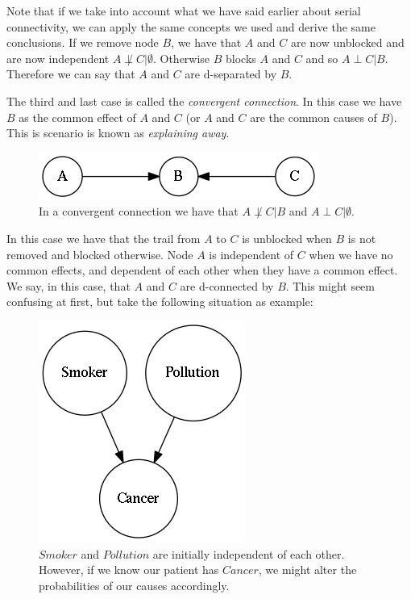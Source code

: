 \documentclass{amsart}
\theoremstyle{plain}
\begin{document}
Note that if we take into account what we have said earlier about serial connectivity, we can apply
the same concepts we used and derive the same conclusions. If we remove node $B$, we have that
$A$ and $C$ are now unblocked and are now independent $A\not\perp C|\emptyset$. Otherwise $B$
blocks $A$ and $C$ and so $A\perp C|B$. Therefore we can say that $A$ and $C$ are d-separated by
$B$.

The third and last case is called the \textit{convergent connection}. In this case we have $B$ as
the common effect of $A$ and $C$ (or $A$ and $C$ are the common causes of $B$). This is scenario is
known as \textit{explaining away}.

\begin{figure}[h]
  \captionsetup{justification=centering}
  \centering\includegraphics[scale=0.3]{graphs/convergent.png}
  \caption{In a convergent connection we have that $A\not\perp C|B$ and $A\perp C|\emptyset$.}
\end{figure}

In this case we have that the trail from $A$ to $C$ is unblocked when $B$ is not removed and
blocked otherwise. Node $A$ is independent of $C$ when we have no common effects, and dependent of
each other when they have a common effect. We say, in this case, that $A$ and $C$ are d-connected
by $B$. This might seem confusing at first, but take the following situation as example:

\begin{figure}[h]
  \captionsetup{justification=centering}
  \centering\includegraphics[scale=0.3]{graphs/cancer.png}
  \caption{$Smoker$ and $Pollution$ are initially independent of each other. However, if we know
  our patient has $Cancer$, we might alter the probabilities of our causes accordingly.}
\end{figure}
\end{document}
